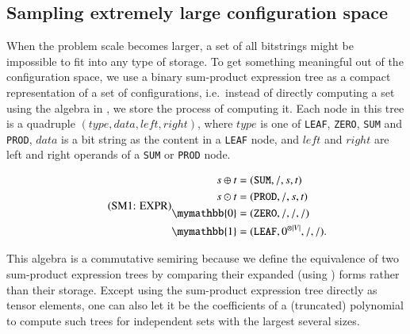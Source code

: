 \documentclass[review, onefignum, onetabnum]{siamart190516}
\begin{document}
\subsection{Sampling extremely large configuration space}
When the problem scale becomes larger, a set of all bitstrings might be impossible to fit into any type of storage.
To get something meaningful out of the configuration space, we use a binary sum-product expression tree as a compact representation of a set of configurations, i.e.\ instead of directly computing a set using the algebra in , we store the process of computing it.
Each node in this tree is a quadruple $(type, data, left, right)$, where $type$ is one of \texttt{LEAF}, \texttt{ZERO}, \texttt{SUM} and \texttt{PROD}, $data$ is a bit string as the content in a \texttt{LEAF} node, and $left$ and $right$ are left and right operands of a \texttt{SUM} or \texttt{PROD} node.

\begin{equation}
\eqname{EXPR}
\begin{split}
    s \oplus t &= (\texttt{SUM}, /, s, t)\\
    s \odot t &= (\texttt{PROD}, /, s, t)\\
    \mymathbb{0} &= (\texttt{ZERO}, /, /, /)\\
    \mymathbb{1} &= (\texttt{LEAF}, 0^{\otimes |V|}, /, /).
\end{split}\label{eq:expr}
\end{equation}

This algebra is a commutative semiring because we define the equivalence of two sum-product expression trees by comparing their expanded (using ) forms rather than their storage.
Except using the sum-product expression tree directly as tensor elements, one can also let it be the coefficients of a (truncated) polynomial to compute such trees for independent sets with the largest several sizes.
\end{document}
